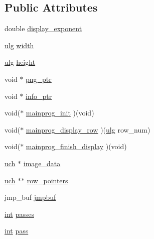 \subsection*{Public Attributes}
\begin{DoxyCompactItemize}
\item 
double \mbox{\hyperlink{struct__mainprog__info_acc432fe80c5761bb0fb27c03a346b1f8}{display\+\_\+exponent}}
\item 
\mbox{\hyperlink{readpng_8h_abd6f60bf9450af2ecb94097a32c19a64}{ulg}} \mbox{\hyperlink{struct__mainprog__info_a83eef09db07997f02e0e612663c23336}{width}}
\item 
\mbox{\hyperlink{readpng_8h_abd6f60bf9450af2ecb94097a32c19a64}{ulg}} \mbox{\hyperlink{struct__mainprog__info_aa45625593a0a10fb670c7421f4fabe6b}{height}}
\item 
void $\ast$ \mbox{\hyperlink{struct__mainprog__info_ac0702618113cdf0fbd33d52088911650}{png\+\_\+ptr}}
\item 
void $\ast$ \mbox{\hyperlink{struct__mainprog__info_a0c4e34a41ce837b509bad44e728bb6fc}{info\+\_\+ptr}}
\item 
void($\ast$ \mbox{\hyperlink{struct__mainprog__info_a190a9c0ce78a25b7fe1b4b98f6ecc15e}{mainprog\+\_\+init}} )(void)
\item 
void($\ast$ \mbox{\hyperlink{struct__mainprog__info_a07d6854136e24d8ab47da49abce4fe74}{mainprog\+\_\+display\+\_\+row}} )(\mbox{\hyperlink{readpng_8h_abd6f60bf9450af2ecb94097a32c19a64}{ulg}} row\+\_\+num)
\item 
void($\ast$ \mbox{\hyperlink{struct__mainprog__info_a0f77ae68d41fe119994c1d8ac9944d24}{mainprog\+\_\+finish\+\_\+display}} )(void)
\item 
\mbox{\hyperlink{readpng_8h_af3307af5922c72924a837559c801a8a4}{uch}} $\ast$ \mbox{\hyperlink{struct__mainprog__info_a09bdbae520338b9a1b1ba95d58ed6e2e}{image\+\_\+data}}
\item 
\mbox{\hyperlink{readpng_8h_af3307af5922c72924a837559c801a8a4}{uch}} $\ast$$\ast$ \mbox{\hyperlink{struct__mainprog__info_a9bb9eb4042d5d22fec4a4a08177db059}{row\+\_\+pointers}}
\item 
jmp\+\_\+buf \mbox{\hyperlink{struct__mainprog__info_af89790161025328b8bfa59635288023a}{jmpbuf}}
\item 
\mbox{\hyperlink{ioapi_8h_a787fa3cf048117ba7123753c1e74fcd6}{int}} \mbox{\hyperlink{struct__mainprog__info_ac02d3fca9526ca93cde7e82b3de3ce74}{passes}}
\item 
\mbox{\hyperlink{ioapi_8h_a787fa3cf048117ba7123753c1e74fcd6}{int}} \mbox{\hyperlink{struct__mainprog__info_abf4af3bc89aa81cf9ce3b2dc9edb165a}{pass}}
$$
\end{DoxyCompactItemize}

